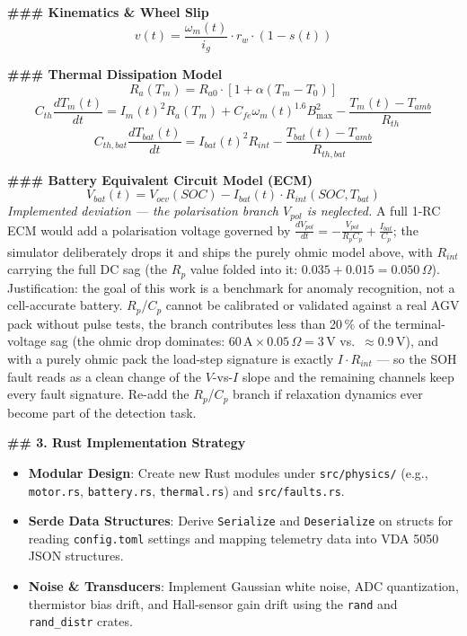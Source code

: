 \begin{promptbox}
\textbf{\#\#\# Kinematics \& Wheel Slip}
\[
    v(t) = \frac{\omega_m(t)}{i_g} \cdot r_w \cdot (1 - s(t))
\]

\textbf{\#\#\# Thermal Dissipation Model}
\[
    R_a(T_m) = R_{a0} \cdot [1 + \alpha(T_m - T_0)]
\]
\[
    C_{th} \frac{dT_m(t)}{dt} = I_m(t)^2 R_a(T_m) + C_{fe} \omega_m(t)^{1.6} B_{\max}^2 - \frac{T_m(t) - T_{\mathit{amb}}}{R_{th}}
\]
\[
    C_{\mathit{th,bat}} \frac{dT_{\mathit{bat}}(t)}{dt} = I_{\mathit{bat}}(t)^2 R_{\mathit{int}} - \frac{T_{\mathit{bat}}(t) - T_{\mathit{amb}}}{R_{\mathit{th,bat}}}
\]

\textbf{\#\#\# Battery Equivalent Circuit Model (ECM)}
\[
    V_{\mathit{bat}}(t) = V_{\mathit{ocv}}(\mathit{SOC}) - I_{\mathit{bat}}(t) \cdot R_{\mathit{int}}(\mathit{SOC}, T_{\mathit{bat}})
\]
\textit{Implemented deviation --- the polarisation branch $V_{\mathit{pol}}$ is neglected.} A full 1-RC ECM would add a polarisation voltage governed by $\frac{dV_{\mathit{pol}}}{dt} = -\frac{V_{\mathit{pol}}}{R_p C_p} + \frac{I_{\mathit{bat}}}{C_p}$; the simulator deliberately drops it and ships the purely ohmic model above, with $R_{\mathit{int}}$ carrying the full DC sag (the $R_p$ value folded into it: $0.035 + 0.015 = 0.050\,\Omega$). Justification: the goal of this work is a benchmark for anomaly recognition, not a cell-accurate battery. $R_p$/$C_p$ cannot be calibrated or validated against a real AGV pack without pulse tests, the branch contributes less than 20\,\% of the terminal-voltage sag (the ohmic drop dominates: $60\,\mathrm{A} \times 0.05\,\Omega = 3\,\mathrm{V}$ vs.\ $\approx$0.9\,V), and with a purely ohmic pack the load-step signature is exactly $I \cdot R_{\mathit{int}}$ --- so the SOH fault reads as a clean change of the $V$-vs-$I$ slope and the remaining channels keep every fault signature. Re-add the $R_p$/$C_p$ branch if relaxation dynamics ever become part of the detection task.

\textbf{\#\# 3. Rust Implementation Strategy}

\begin{itemize}
    \item \textbf{Modular Design}: Create new Rust modules under \texttt{src/physics/} (e.g., \texttt{motor.rs}, \texttt{battery.rs}, \texttt{thermal.rs}) and \texttt{src/faults.rs}.
    \item \textbf{Serde Data Structures}: Derive \texttt{Serialize} and \texttt{Deserialize} on structs for reading \texttt{config.toml} settings and mapping telemetry data into VDA 5050 JSON structures.
    \item \textbf{Noise \& Transducers}: Implement Gaussian white noise, ADC quantization, thermistor bias drift, and Hall-sensor gain drift using the \texttt{rand} and \texttt{rand\_distr} crates.
\end{itemize}


\end{promptbox}
